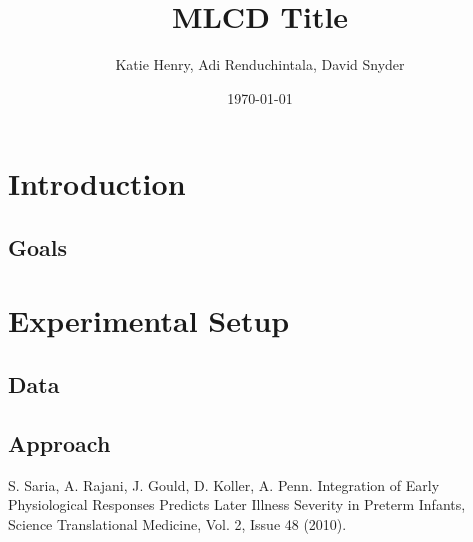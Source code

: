 \documentclass[dvips,12pt]{article}
\begin{document}

\title{MLCD Title}
\author{Katie Henry, Adi Renduchintala, David Snyder}
\date{\today}



\maketitle


\section{Introduction}

\subsection{Goals}

\section{Experimental Setup}

\subsection{Data}

\subsection{Approach}

 
\begin{thebibliography}{99}
 S. Saria, 
A. Rajani, 
J. Gould, 
D. Koller, 
A. Penn. 
{Integration of Early Physiological Responses Predicts Later Illness Severity in Preterm Infants},
Science Translational Medicine, Vol. 2, Issue 48 (2010).

\end{thebibliography}
\end{document}
